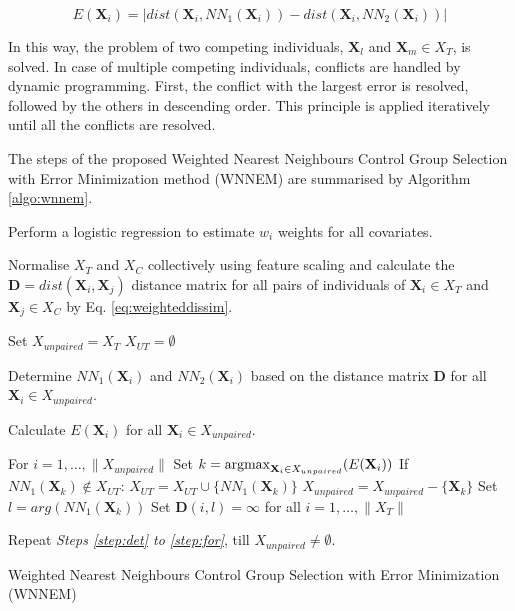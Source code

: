 		\begin{equation}
			\label{eq:err}
			E(\textbf{X}_i) = |dist(\textbf{X}_i, NN_1(\textbf{X}_i)) - dist(\textbf{X}_i, NN_2(\textbf{X}_i))|
		\end{equation}
								
		In this way, the problem of two competing individuals, $\textbf{X}_l$ and $\textbf{X}_m \in X_T$, is solved. In case of multiple competing individuals, conflicts are handled by dynamic programming. First, the conflict with the largest error is resolved, followed by the others in descending order. This principle is applied iteratively until all the conflicts are resolved. 
								
		The steps of the proposed Weighted Nearest Neighbours Control Group Selection with Error Minimization method (WNNEM) are summarised by Algorithm \ref{algo:wnnem}.
								
		\begin{algorithm}
													
			Perform a logistic regression to estimate $w_i$ weights for all covariates.
													
			Normalise $X_T$ and $X_C$ collectively using feature scaling and calculate the $\textbf{D}=dist(\textbf{X}_i, \textbf{X}_j)$ distance matrix for all pairs of individuals of $\textbf{X}_i \in X_T$ and $\textbf{X}_j \in X_C$ by Eq. \ref{eq:weighteddissim}.
													
			Set 
			\linebreak
			\text{\quad}
			$X_{unpaired}=X_T$
			\linebreak
			\text{\quad}
			$X_{UT}=\emptyset$ 
													
			Determine $NN_1(\textbf{X}_i)$ and $NN_2(\textbf{X}_i)$ based on the distance matrix $\textbf{D}$ for all $\textbf{X}_i \in X_{unpaired}$. \label{step:det}
													
			Calculate $E(\textbf{X}_i)$  for all $\textbf{X}_i \in X_{unpaired}$. 
													
			For $i=1, \dots, \|X_{unpaired}\|$ 
			\linebreak
			\text{\quad}Set $k=\operatorname*{argmax}_{\textbf{X}_i \in X_{unpaired}} (E(\textbf{X}_i))$
			\linebreak
			\text{\quad}
			If $NN_1(\textbf{X}_k) \notin X_{UT}$:
			\linebreak
			\text{\qquad}
			$X_{UT}=X_{UT}\cup\{NN_1(\textbf{X}_k)\}$
			\linebreak
			\text{\qquad}
			$X_{unpaired}=X_{unpaired}-\{\textbf{X}_k\}$
			\linebreak
			\text{\qquad}
			Set $l=arg(NN_1(\textbf{X}_k))$
			\linebreak
			\text{\qquad}
			Set $\textbf{D}(i,l)=\infty$ for all $i=1, \dots, \|X_T\|$ \label{step:for}
													
			Repeat \textit{Steps \ref{step:det} to \ref{step:for}}, till $X_{unpaired}\neq\emptyset$.
													
			\caption{Weighted Nearest Neighbours Control Group Selection with Error Minimization (WNNEM)}
			\label{algo:wnnem}
		\end{algorithm}
				  
